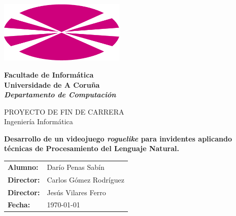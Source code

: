 %
%

%

\begin{titlepage}

	\begin{center}

		\includegraphics[width=6cm]{./eps/logo_udc.png}
		\vspace{2cm}

		{\Large{\textbf{Facultade de Informática \\ Universidade de A Coruña}}}
		\\
		{\it \large{\textbf{Departamento de Computación}}}
		\vspace{1cm}

		{\large PROYECTO DE FIN DE CARRERA\\Ingeniería Informática}
		\vspace{1cm}

		\textbf{\Large Desarrollo de un videojuego \textit{roguelike} para invidentes aplicando técnicas de Procesamiento del Lenguaje Natural.}
		\vspace{7cm}
	\end{center}

	\begin{flushright}
		\begin{tabular}{ll}
			\large{\textbf{Alumno:}}	&
			\large{Darío Penas Sabín} \\

			\large{\textbf{Director:}}	&
			\large{Carlos Gómez Rodríguez} \\
			
			\large{\textbf{Director:}}	&
			\large{Jesús Vilares Ferro} \\

			\large{\textbf{Fecha:}}	&
			\large{\today} \\
		\end{tabular}
	\end{flushright}

\end{titlepage}
